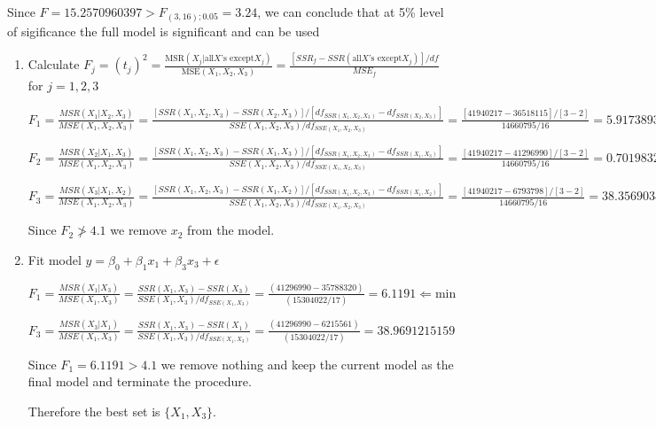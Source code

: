 \documentclass{article}
\begin{document}
\begin{enumerate}[1.]
\begin{enumerate}[(a)]
Since $F = 15.2570960397 > F_{(3, 16); 0.05} = 3.24$, we can conclude that at 5\% level of sigificance the full model is significant and can be used

\begin{enumerate}[(1)]

\item Calculate $F_j = (t_j)^2 = \frac{ \text{MSR}(X_j | \text{all} X \text{'s except} X_j) }{\text{MSE}(X_1, X_2, X_3)} = \frac{ [SSR_f - SSR(\text{all} X\text{'s except} X_j)]/df}{MSE_f}$ for $j = 1,2,3$

$F_1 =
\frac{ MSR(X_1 | X_2, X_3)
}{
MSE(X_1, X_2, X_3)
}
=
\frac{
[SSR(X_1, X_2, X_3) - SSR(X_2, X_3)]/[df_{SSR(X_1,X_2,X_3)} - df_{SSR(X_2,X_3)}]
}{
SSE(X_1, X_2, X_3)/df_{SSE(X_1, X_2, X_3)}
}
= 
\frac{
[41 940 217 - 36 518 115]/[3 - 2]
}{
14 660 795 / 16
}
= 5.91738933666
$

$F_2 =
\frac{ MSR(X_2 | X_1, X_3)
}{
MSE(X_1, X_2, X_3)
}
=
\frac{
[SSR(X_1, X_2, X_3) - SSR(X_1, X_3)]/[df_{SSR(X_1,X_2,X_3)} - df_{SSR(X_1,X_3)}]
}{
SSE(X_1, X_2, X_3)/df_{SSE(X_1, X_2, X_3)}
}
= 
\frac{
[41 940 217 - 41 296 990]/[3 - 2]
}{
14 660 795 / 16
}
= 0.701983214416 \Leftarrow \text{min}
$

$F_3 =
\frac{ MSR(X_3 | X_1, X_2)
}{
MSE(X_1, X_2, X_3)
}
=
\frac{
[SSR(X_1, X_2, X_3) - SSR(X_1, X_2)]/[df_{SSR(X_1,X_2,X_3)} - df_{SSR(X_1,X_2)}]
}{
SSE(X_1, X_2, X_3)/df_{SSE(X_1, X_2, X_3)}
}
= 
\frac{
[41 940 217 - 6 793 798]/[3 - 2]
}{
14 660 795 / 16
}
= 38.3569038378
$

Since $F_2 \ngtr 4.1$ we remove $x_2$ from the model.

\item Fit model $y = \beta_0 + \beta_1x_1 + \beta_3x_3 + \epsilon$

$F_1 =
\frac{ MSR(X_1 | X_3)
}{
MSE(X_1, X_3)
}
=
\frac{
SSR(X_1, X_3) - SSR(X_3)
}{
SSE(X_1,X_3)/df_{SSE(X_1, X_3)}
}
= 
\frac{
(41 296 990 - 35 788 320)
}{
(15 304 022 / 17)
}
= 6.1191 \Leftarrow \text{min}
$

$F_3 =
\frac{ MSR(X_3 | X_1)
}{
MSE(X_1, X_3)
}
=
\frac{
SSR(X_1, X_3) - SSR(X_1)
}{
SSE(X_1,  X_3)/df_{SSE(X_1, X_3)}
}
= 
\frac{
(41 296 990 - 6 215 561 )
}{
(15 304 022 / 17)
}
= 38.9691215159
$

Since $F_1 = 6.1191 > 4.1$ we remove nothing and keep the current model as the final model and terminate the procedure.

Therefore the best set is $\{X_1, X_3\}$.

\end{enumerate}


\end{enumerate}
\end{enumerate}
\end{document}
